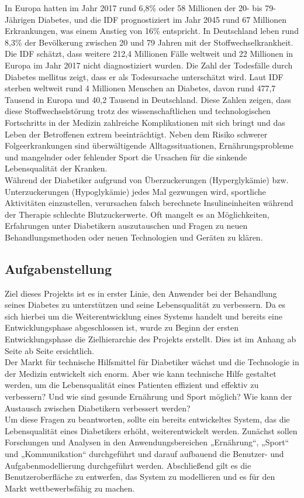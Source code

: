 	In Europa hatten im Jahr 2017 rund 6,8\% oder 58 Millionen der 20- bis 79-Jährigen Diabetes, und die IDF prognostiziert im Jahr 2045 rund 67 Millionen Erkrankungen, was einem Anstieg von 16\% entspricht. In Deutschland leben rund 8,3\% der Bevölkerung zwischen 20 und 79 Jahren mit der Stoffwechselkrankheit. Die IDF schätzt, dass weitere 212,4 Millionen Fälle weltweit und 22 Millionen in Europa im Jahr 2017 nicht diagnostiziert wurden.\cite[S. 110 ff.]{IDF} Die Zahl der Todesfälle durch Diabetes mellitus zeigt, dass er als Todesursache unterschätzt wird. Laut IDF sterben weltweit rund 4 Millionen Menschen an Diabetes, davon rund 477,7 Tausend in Europa und 40,2 Tausend in Deutschland.\cite[S. 46]{IDF} Diese Zahlen zeigen, dass diese Stoffwechselstörung trotz des wissenschaftlichen und technologischen Fortschritts in der Medizin zahlreiche Komplikationen mit sich bringt und das Leben der Betroffenen extrem beeinträchtigt. Neben dem Risiko schwerer Folgeerkrankungen sind überwältigende Alltagssituationen, Ernährungsprobleme und mangelnder oder fehlender Sport die Ursachen für die sinkende Lebensqualität der Kranken.\\
	Während der Diabetiker aufgrund von Überzuckerungen (Hyperglykämie) bzw. Unterzuckerungen (Hypoglykämie) jedes Mal gezwungen wird, sportliche Aktivitäten einzustellen, verursachen falsch berechnete Insulineinheiten während der Therapie schlechte Blutzuckerwerte. Oft mangelt es an Möglichkeiten, Erfahrungen unter Diabetikern auszutauschen und Fragen zu neuen Behandlungsmethoden oder neuen Technologien und Geräten zu klären.
\subsection{Aufgabenstellung}
	Ziel dieses Projekts ist es in erster Linie, den Anwender bei der Behandlung seines Diabetes zu unterstützen und seine Lebensqualität zu verbessern. Da es sich hierbei um die Weiterentwicklung eines Systems handelt und bereits eine Entwicklungsphase abgeschlossen ist, wurde zu Beginn der ersten Entwicklungsphase die Zielhierarchie des Projekts erstellt. Dies ist im Anhang ab Seite ab Seite \pageref{section:Zielhierarchie} ersichtlich. \\
	Der Markt für technische Hilfsmittel für Diabetiker wächst und die Technologie in der Medizin entwickelt sich enorm. Aber wie kann technische Hilfe gestaltet werden, um die Lebensqualität eines Patienten effizient und effektiv zu verbessern? Und wie sind gesunde Ernährung und Sport möglich? Wie kann der Austausch zwischen Diabetikern verbessert werden?\\
	Um diese Fragen zu beantworten, sollte ein bereits entwickeltes System, das die Lebensqualität eines Diabetikers erhöht, weiterentwickelt werden. Zunächst sollen Forschungen und Analysen in den Anwendungsbereichen „Ernährung“, „Sport“ und „Kommunikation“ durchgeführt und darauf aufbauend die Benutzer- und Aufgabenmodellierung durchgeführt werden. Abschließend gilt es die Benutzeroberfläche zu entwerfen, das System zu modellieren und es für den Markt wettbewerbsfähig zu machen.
